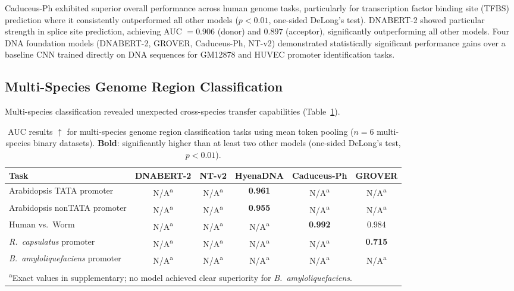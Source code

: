 \documentclass[11pt]{article}
\begin{document}
Caduceus-Ph exhibited superior overall performance across human genome tasks, particularly for transcription factor binding site (TFBS) prediction where it consistently outperformed all other models ($p < 0.01$, one-sided DeLong's test). DNABERT-2 showed particular strength in splice site prediction, achieving AUC $= 0.906$ (donor) and $0.897$ (acceptor), significantly outperforming all other models. Four DNA foundation models (DNABERT-2, GROVER, Caduceus-Ph, NT-v2) demonstrated statistically significant performance gains over a baseline CNN trained directly on DNA sequences for GM12878 and HUVEC promoter identification tasks.

\subsection{Multi-Species Genome Region Classification}

Multi-species classification revealed unexpected cross-species transfer capabilities (Table~\ref{tab:multispecies}).

\begin{table}[htbp]
\centering
\caption{AUC results $\uparrow$ for multi-species genome region classification tasks using mean token pooling ($n = 6$ multi-species binary datasets). \textbf{Bold}: significantly higher than at least two other models (one-sided DeLong's test, $p < 0.01$).}
\label{tab:multispecies}
\begin{adjustbox}{max width=\textwidth}
\begin{tabular}{lccccc}
\toprule
\textbf{Task} & \textbf{DNABERT-2} & \textbf{NT-v2} & \textbf{HyenaDNA} & \textbf{Caduceus-Ph} & \textbf{GROVER} \\
\midrule
Arabidopsis TATA promoter & N/A\textsuperscript{a} & N/A\textsuperscript{a} & \textbf{0.961} & N/A\textsuperscript{a} & N/A\textsuperscript{a} \\
Arabidopsis nonTATA promoter & N/A\textsuperscript{a} & N/A\textsuperscript{a} & \textbf{0.955} & N/A\textsuperscript{a} & N/A\textsuperscript{a} \\
Human vs.\ Worm & N/A\textsuperscript{a} & N/A\textsuperscript{a} & N/A\textsuperscript{a} & \textbf{0.992} & 0.984 \\
\textit{R.\ capsulatus} promoter & N/A\textsuperscript{a} & N/A\textsuperscript{a} & N/A\textsuperscript{a} & N/A\textsuperscript{a} & \textbf{0.715} \\
\textit{B.\ amyloliquefaciens} promoter & N/A\textsuperscript{a} & N/A\textsuperscript{a} & N/A\textsuperscript{a} & N/A\textsuperscript{a} & N/A\textsuperscript{a} \\
\bottomrule
\multicolumn{6}{l}{\footnotesize \textsuperscript{a}Exact values in supplementary; no model achieved clear superiority for \textit{B.\ amyloliquefaciens}.} \\
\end{tabular}
\end{adjustbox}
\end{table}
\end{document}
